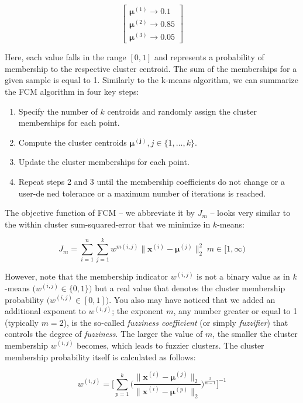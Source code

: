 \documentclass[letterpaper]{report}
\begin{document}
\[
\begin{bmatrix}
\mathbf{\mu}^{(1)} \rightarrow 0.1 \\
\mathbf{\mu}^{(2)} \rightarrow 0.85 \\
\mathbf{\mu}^{(3)} \rightarrow 0.05 
\end{bmatrix}
\]

Here, each value falls in the range $[0, 1]$ and represents a probability of membership to the respective cluster centroid. The sum of the memberships for a given sample is equal to 1. Similarly to the k-means algorithm, we can summarize the FCM algorithm in four key steps:

\begin{enumerate}
\item Specify the number of $k$ centroids and randomly assign the cluster memberships for each point.
\item Compute the cluster centroids $\mathbf{\mu^{(j)}}, j \in \{1, \dots, k \}$.
\item Update the cluster memberships for each point.
\item Repeat steps 2 and 3 until the membership coefficients do not change or a user-de ned tolerance or a maximum number of iterations is reached.
\end{enumerate}

The objective function of FCM -- we abbreviate it by $J_m$ -- looks very similar to the within cluster sum-squared-error that we minimize in $k$-means:

\[
J_m = \sum_{i=1}^{n} \sum_{j=1}^{k} w^{m(i, j)} \big \lVert  \mathbf{x}^{(i)} - \mathbf{\mu}^{(j)} \big \rVert^{2}_{2} \; m \in [1, \infty)
\]

However, note that the membership indicator $w^{(i, j)}$ is not a binary value as in $k$-means $\big( w^{(i, j)} \in \{0, 1\} \big)$ but a real value that denotes the cluster membership probability $\big(  w^{(i, j)} \in [0, 1] \big).$ You also may have noticed that we added an additional exponent to $w^{(i, j)}$; the exponent $m$, any number greater or equal to 1 (typically $m=2$), is the so-called \textit{fuzziness coefficient} (or simply \textit{fuzzifier}) that controls the degree of \textit{fuzziness}. The larger the value of $m$, the smaller the cluster membership $w^{(i, j)}$ becomes, which leads to fuzzier clusters. The cluster membership probability itself is calculated as follows:

\[
w^{(i, j)} = \Bigg[ \sum^{k}_{p=1} \Bigg(  \frac{\lVert \mathbf{x}^{(i)} - \mathbf{\mu}^{(j)}  \rVert_2}{\lVert \mathbf{x}^{(i)} - \mathbf{\mu}^{(p)} \rVert_2}   \Bigg)^{\frac{2}{m-1}} \Bigg]^{-1}
\]
\end{document}

